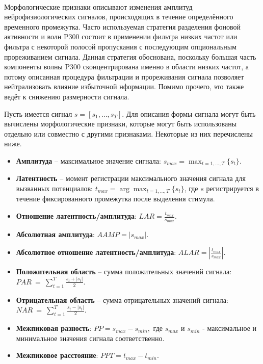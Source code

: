 \documentclass[12pt,a4paper,oneside,fleqn,leqno]{article}
\newcounter{pe} %
\newcommand*{\Nep}{\addtocounter{pe}{1}{\arabic{pe}$^{\circ}$.\;}}
\newcommand*{\NepS}{\mbox{} \\ \Nep}
\begin{document}
	\NepS {\bf Морфологические признаки}
	\par Морфологические признаки описывают изменения амплитуд нейрофизиологических сигналов, происходящих в течение определённого временного промежутка. Часто используемая стратегия разделения фоновой активности и волн P300 состоит в применении фильтра низких частот или фильтра с некоторой полосой пропускания с последующим опциональным прореживанием сигнала. Данная стратегия обоснована, поскольку большая часть компоненты волны P300 сконцентрирована именно в области низких частот, а потому описанная процедура фильтрации и прореживания сигнала позволяет нейтрализовать влияние избыточной нформации. Помимо прочего, это также ведёт к снижению размерности сигнала.
	\par Пусть имеется сигнал $s = [s_1, \dots, s_T].$ Для описания формы сигнала могут быть вычислены морфологические признаки, которые могут быть использованы отдельно или совместно с другими признаками. Некоторые из них перечислены ниже.
	\begin{itemize}
	\item 
	{\bf Амплитуда} -- максимальное значение сигнала: $\displaystyle s_{max} = \max_{t = 1, \dots, T} \{{s_t}\}$.
	\item
	{\bf Латентность} -- момент регистрации максимального значения сигнала для вызванных потенциалов: $\displaystyle t_{max} = \arg \max_{t=1, \dots, T} \{ s_t \}$, где $s$ регистрируется в течение фиксированного промежутка после выделения стимула.
	\item
	{\bf Отношение латентность/амплитуда}: $\displaystyle LAR = \frac{t_{max}}{s_{max}}$.
	\item
	{\bf Абсолютная амплитуда}: $\displaystyle AAMP = \left| s_{max} \right|$.
	\item
	{\bf Абсолютное отношение латентность/амплитуда}: $\displaystyle ALAR = \left| \frac{t_{max}}{s_{max}} \right|$.
	\item
	{\bf Положительная область} -- сумма положительных значений сигнала: \\ $\displaystyle PAR~=~\sum_{t = 1} ^ T \frac{s_t + |s_t|}{2}.$
	\item
	{\bf Отрицательная область} -- сумма отрицательных значений сигнала: \\$\displaystyle NAR~=~\sum_{t = 1} ^ T \frac{s_t - |s_t|}{2}.$
	\item
	{\bf Межпиковая разность}: $\displaystyle PP = s_{max} - s_{min},$ где $s_{max}$ и $s_{min}$ - максимальное и минимальное значения сигнала соответственно.
	\item
	{\bf Межпиковое расстояние}: $\displaystyle PPT = t_{max} - t_{min}.$
	\end{itemize}
\end{document}
